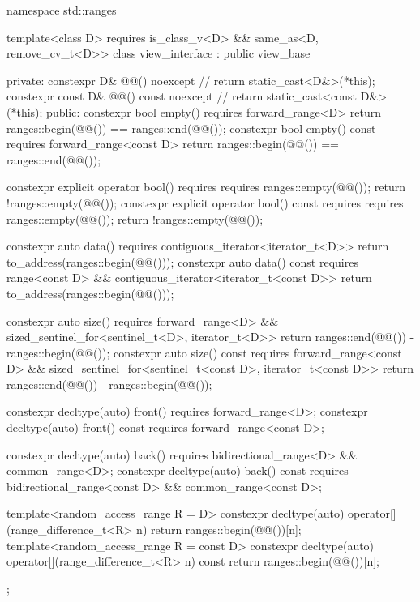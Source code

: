 %
\begin{codeblock}
namespace std::ranges {
  template<class D>
    requires is_class_v<D> && same_as<D, remove_cv_t<D>>
  class view_interface : public view_base {
  private:
    constexpr D& @@() noexcept {                   // \expos
      return static_cast<D&>(*this);
    }
    constexpr const D& @@() const noexcept {       // \expos
      return static_cast<const D&>(*this);
    }
  public:
    constexpr bool empty() requires forward_range<D> {
      return ranges::begin(@@()) == ranges::end(@@());
    }
    constexpr bool empty() const requires forward_range<const D> {
      return ranges::begin(@@()) == ranges::end(@@());
    }

    constexpr explicit operator bool()
      requires requires { ranges::empty(@@()); } {
        return !ranges::empty(@@());
      }
    constexpr explicit operator bool() const
      requires requires { ranges::empty(@@()); } {
        return !ranges::empty(@@());
      }

    constexpr auto data() requires contiguous_iterator<iterator_t<D>> {
      return to_address(ranges::begin(@@()));
    }
    constexpr auto data() const
      requires range<const D> && contiguous_iterator<iterator_t<const D>> {
        return to_address(ranges::begin(@@()));
      }

    constexpr auto size() requires forward_range<D> &&
      sized_sentinel_for<sentinel_t<D>, iterator_t<D>> {
        return ranges::end(@@()) - ranges::begin(@@());
      }
    constexpr auto size() const requires forward_range<const D> &&
      sized_sentinel_for<sentinel_t<const D>, iterator_t<const D>> {
        return ranges::end(@@()) - ranges::begin(@@());
      }

    constexpr decltype(auto) front() requires forward_range<D>;
    constexpr decltype(auto) front() const requires forward_range<const D>;

    constexpr decltype(auto) back() requires bidirectional_range<D> && common_range<D>;
    constexpr decltype(auto) back() const
      requires bidirectional_range<const D> && common_range<const D>;

    template<random_access_range R = D>
      constexpr decltype(auto) operator[](range_difference_t<R> n) {
        return ranges::begin(@@())[n];
      }
    template<random_access_range R = const D>
      constexpr decltype(auto) operator[](range_difference_t<R> n) const {
        return ranges::begin(@@())[n];
      }
  };
}
\end{codeblock}

